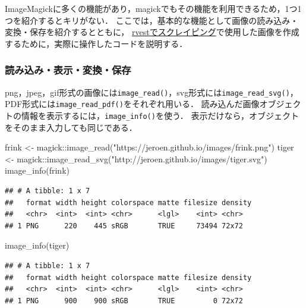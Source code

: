 \documentclass[
]{article}
\newenvironment{Shaded}{\begin{snugshade}}{\end{snugshade}}
\newcommand{\FunctionTok}[1]{\textcolor[rgb]{0.00,0.00,0.00}{#1}}
\newcommand{\NormalTok}[1]{#1}
\newcommand{\OtherTok}[1]{\textcolor[rgb]{0.56,0.35,0.01}{#1}}
\newcommand{\SpecialCharTok}[1]{\textcolor[rgb]{0.00,0.00,0.00}{#1}}
\newcommand{\StringTok}[1]{\textcolor[rgb]{0.31,0.60,0.02}{#1}}
\begin{document}
ImageMagickに多くの機能があり，magickでもその機能を利用できるため，1つ1つを紹介するとキリがない．
ここでは，基本的な機能として画像の読み込み・変換・保存を紹介するとともに，
\protect\hyperlink{rvest}{rvestでスクレイピング}で使用した画像を作成するために，実際に操作したコードを説明する．

\hypertarget{ux8aadux307fux8fbcux307fux8868ux793aux5909ux63dbux4fddux5b58}{%
\subsubsection{読み込み・表示・変換・保存}\label{ux8aadux307fux8fbcux307fux8868ux793aux5909ux63dbux4fddux5b58}}

png，jpeg，gif形式の画像には\texttt{image\_read()}，svg形式には\texttt{image\_read\_svg()}，PDF形式には\texttt{image\_read\_pdf()}をそれぞれ用いる．
読み込んだ画像オブジェクトの情報を表示するには，\texttt{image\_info()}を使う．
表示だけなら，オブジェクトをそのまま入力しても同じである．

\begin{Shaded}
\begin{Highlighting}[]
\NormalTok{frink }\OtherTok{\textless{}{-}}\NormalTok{ magick}\SpecialCharTok{::}\FunctionTok{image\_read}\NormalTok{(}\StringTok{"https://jeroen.github.io/images/frink.png"}\NormalTok{)}
\NormalTok{tiger }\OtherTok{\textless{}{-}}\NormalTok{ magick}\SpecialCharTok{::}\FunctionTok{image\_read\_svg}\NormalTok{(}\StringTok{"http://jeroen.github.io/images/tiger.svg"}\NormalTok{)}
\FunctionTok{image\_info}\NormalTok{(frink)}
\end{Highlighting}
\end{Shaded}

\begin{verbatim}
## # A tibble: 1 x 7
##   format width height colorspace matte filesize density
##   <chr>  <int>  <int> <chr>      <lgl>    <int> <chr>  
## 1 PNG      220    445 sRGB       TRUE     73494 72x72
\end{verbatim}

\begin{Shaded}
\begin{Highlighting}[]
\FunctionTok{image\_info}\NormalTok{(tiger)}
\end{Highlighting}
\end{Shaded}

\begin{verbatim}
## # A tibble: 1 x 7
##   format width height colorspace matte filesize density
##   <chr>  <int>  <int> <chr>      <lgl>    <int> <chr>  
## 1 PNG      900    900 sRGB       TRUE         0 72x72
\end{verbatim}
\end{document}
